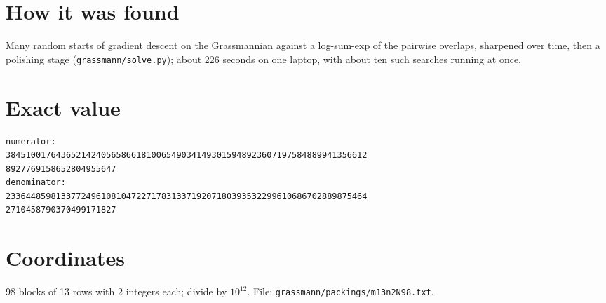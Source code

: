 \documentclass[11pt,a4paper]{article}
\begin{document}
\section{How it was found}
Many random starts of gradient descent on the Grassmannian against a log-sum-exp of the pairwise overlaps, sharpened over time, then a polishing stage (\texttt{grassmann/solve.py}); about 226 seconds on one laptop, with about ten such searches running at once.


\appendix
\section{Exact value}
{\small
\begin{verbatim}
numerator:
384510017643652142405658661810065490341493015948923607197584889941356612
8927769158652804955647
denominator:
233644859813377249610810472271783133719207180393532299610686702889875464
2710458790370499171827
\end{verbatim}}

\section{Coordinates}
98 blocks of 13 rows with 2 integers each; divide by $10^{12}$. File: \texttt{grassmann/packings/m13n2N98.txt}.
{\tiny
\begin{multicols}{4}
\end{multicols}}
\end{document}
